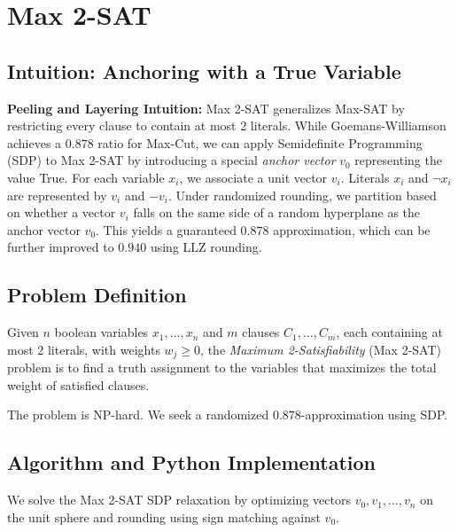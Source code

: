 \setcounter{chapter}{25}
\chapter{Max 2-SAT}
\label{ch:max_2sat}

\section{Intuition: Anchoring with a True Variable}

\begin{intuitionbox}
\textbf{Peeling and Layering Intuition:} Max 2-SAT generalizes Max-SAT by restricting every clause to contain at most 2 literals. While Goemans-Williamson achieves a $0.878$ ratio for Max-Cut, we can apply Semidefinite Programming (SDP) to Max 2-SAT by introducing a special \emph{anchor vector} $v_0$ representing the value True. For each variable $x_i$, we associate a unit vector $v_i$. Literals $x_i$ and $\neg x_i$ are represented by $v_i$ and $-v_i$. Under randomized rounding, we partition based on whether a vector $v_i$ falls on the same side of a random hyperplane as the anchor vector $v_0$. This yields a guaranteed $0.878$ approximation, which can be further improved to $0.940$ using LLZ rounding.
\end{intuitionbox}

\section{Problem Definition}
Given $n$ boolean variables $x_1, \dots, x_n$ and $m$ clauses $C_1, \dots, C_m$, each containing at most 2 literals, with weights $w_j \ge 0$, the \emph{Maximum 2-Satisfiability} (Max 2-SAT) problem is to find a truth assignment to the variables that maximizes the total weight of satisfied clauses.

The problem is NP-hard. We seek a randomized $0.878$-approximation using SDP.

\section{Algorithm and Python Implementation}
We solve the Max 2-SAT SDP relaxation by optimizing vectors $v_0, v_1, \dots, v_n$ on the unit sphere and rounding using sign matching against $v_0$.


